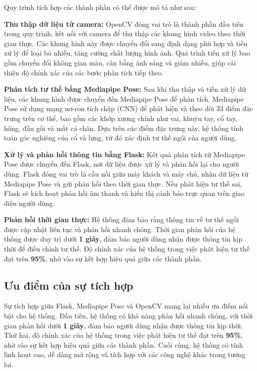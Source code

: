 \documentclass[conference]{IEEEtran}
\begin{document}
Quy trình tích hợp các thành phần có thể được mô tả như sau:

 \textbf{Thu thập dữ liệu từ camera:} OpenCV đóng vai trò là thành phần đầu tiên trong quy trình, kết nối với camera để thu thập các khung hình video theo thời gian thực. Các khung hình này được chuyển đổi sang định dạng phù hợp và tiền xử lý để loại bỏ nhiễu, tăng cường chất lượng hình ảnh. Quá trình tiền xử lý bao gồm chuyển đổi không gian màu, cân bằng ánh sáng và giảm nhiễu, giúp cải thiện độ chính xác của các bước phân tích tiếp theo.

 \textbf{Phân tích tư thế bằng Mediapipe Pose:} Sau khi thu thập và tiền xử lý dữ liệu, các khung hình được chuyển đến Mediapipe Pose để phân tích. Mediapipe Pose sử dụng mạng nơ-ron tích chập (CNN) để phát hiện và theo dõi 33 điểm đặc trưng trên cơ thể, bao gồm các khớp xương chính như vai, khuỷu tay, cổ tay, hông, đầu gối và mắt cá chân. Dựa trên các điểm đặc trưng này, hệ thống tính toán góc nghiêng của cổ và lưng, từ đó xác định tư thế ngồi của người dùng.
 
  \textbf{Xử lý và phản hồi thông tin bằng Flask:} Kết quả phân tích từ Mediapipe Pose được chuyển đến Flask, nơi dữ liệu được xử lý và phản hồi lại cho người dùng. Flask đóng vai trò là cầu nối giữa máy khách và máy chủ, nhận dữ liệu từ Mediapipe Pose và gửi phản hồi theo thời gian thực. Nếu phát hiện tư thế sai, Flask sẽ kích hoạt phản hồi âm thanh và hiển thị cảnh báo trực quan trên giao diện người dùng.
 
  \textbf{Phản hồi thời gian thực:} Hệ thống đảm bảo rằng thông tin về tư thế ngồi được cập nhật liên tục và phản hồi nhanh chóng. Thời gian phản hồi của hệ thống được duy trì dưới \textbf{1 giây}, đảm bảo người dùng nhận được thông tin kịp thời để điều chỉnh tư thế. Độ chính xác của hệ thống trong việc phát hiện tư thế đạt trên \textbf{95\%}, nhờ vào sự kết hợp hiệu quả giữa các thành phần.

\subsection{Ưu điểm của sự tích hợp}
Sự tích hợp giữa Flask, Mediapipe Pose và OpenCV mang lại nhiều ưu điểm nổi bật cho hệ thống. Đầu tiên, hệ thống có khả năng phản hồi nhanh chóng, với thời gian phản hồi dưới \textbf{1 giây}, đảm bảo người dùng nhận được thông tin kịp thời. Thứ hai, độ chính xác của hệ thống trong việc phát hiện tư thế đạt trên \textbf{95\%}, nhờ vào sự kết hợp hiệu quả giữa các thành phần. Cuối cùng, hệ thống có tính linh hoạt cao, dễ dàng mở rộng và tích hợp với các công nghệ khác trong tương lai.
\end{document}
